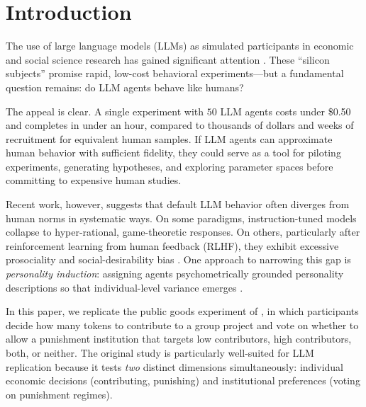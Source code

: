 \documentclass[12pt, a4paper]{article}
\begin{document}
\begin{abstract}
\medskip
\noindent\textbf{Keywords:} LLM agents, behavioral economics, public goods game, Big Five personality, BFI-2, oTree, replication, Homo Silicus
\end{abstract}

\section{Introduction}

The use of large language models (LLMs) as simulated participants in economic and social science research has gained significant attention \citep{horton2023homo, aher2023turing, argyle2023out}. These ``silicon subjects'' promise rapid, low-cost behavioral experiments---but a fundamental question remains: do LLM agents behave like humans?

The appeal is clear. A single experiment with $50$ LLM agents costs under \$0.50 and completes in under an hour, compared to thousands of dollars and weeks of recruitment for equivalent human samples. If LLM agents can approximate human behavior with sufficient fidelity, they could serve as a tool for piloting experiments, generating hypotheses, and exploring parameter spaces before committing to expensive human studies.

Recent work, however, suggests that default LLM behavior often diverges from human norms in systematic ways. On some paradigms, instruction-tuned models collapse to hyper-rational, game-theoretic responses. On others, particularly after reinforcement learning from human feedback (RLHF), they exhibit excessive prosociality and social-desirability bias \citep{salecha2024social}. One approach to narrowing this gap is \emph{personality induction}: assigning agents psychometrically grounded personality descriptions so that individual-level variance emerges \citep{serapio2023personality, jiang2024personallm}.

In this paper, we replicate the public goods experiment of \citet{ertan2009who}, in which participants decide how many tokens to contribute to a group project and vote on whether to allow a punishment institution that targets low contributors, high contributors, both, or neither. The original study is particularly well-suited for LLM replication because it tests \emph{two} distinct dimensions simultaneously: individual economic decisions (contributing, punishing) and institutional preferences (voting on punishment regimes).
\end{document}
